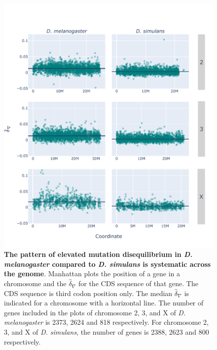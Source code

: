 \begin{figure}[htbp]
\centering
\includegraphics[width=\textwidth]{figures/plots/drosophila/d-conv_manhatten.pdf}
\caption{\textbf{The pattern of elevated mutation disequilibrium in \textit{D. melanogaster} compared to \textit{D. simulans} is systematic across the genome}. Manhattan plots the position of a gene in a chromosome and the $\hat\delta_\nabla$ for the CDS sequence of that gene. The CDS sequence is third codon position only. The median $\hat\delta_\nabla$ is indicated for a chromosome with a horizontal line. The number of genes included in the plots of chromosome 2, 3, and X of \textit{D. melanogaster} is 2373, 2624 and 818 respectively. For chromosome 2, 3, and X of \textit{D. simulans}, the number of genes is 2388, 2623 and 800 respectively.}
\label{fig:drosophila_d-conv_manhattan}
\end{figure}
